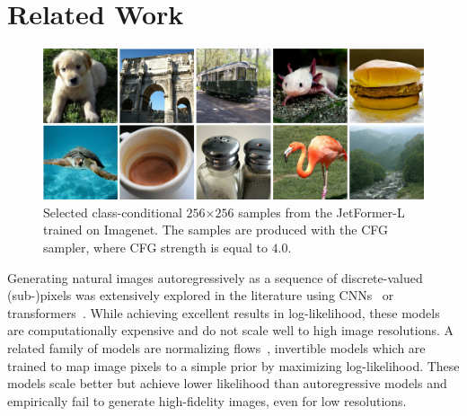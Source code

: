 \documentclass{article} %
\begin{document}
\section{Related Work}

\vspace{-1mm}

\begin{figure}
\vspace{-0.5cm}
    \centering
    \includegraphics[width=\textwidth]{figures/flagship-samples}
    \caption{Selected class-conditional $256$$\times$$256$ samples from the JetFormer-L trained on Imagenet. The samples are produced with the CFG sampler, where CFG strength is equal to $4.0$.}
    \label{fig:imagenet_examples}
\end{figure}

\vspace{-1mm}

Generating natural images autoregressively as a sequence of discrete-valued (sub-)pixels was extensively explored in the literature using CNNs~\citep{van2016pixel, van2016conditional, salimans2016pixelcnn} or transformers~\citep{parmar2018image,chen2020generative}. While achieving excellent results in log-likelihood, these models are computationally expensive and do not scale well to high image resolutions. A related family of models are normalizing flows~\citep{dinh2014nice, dinh2016density, kingma2018glow, ho2019flow++}, invertible models which are trained to map image pixels to a simple prior by maximizing log-likelihood. These models scale better but achieve lower likelihood than autoregressive models and empirically fail to generate high-fidelity images, even for low resolutions.
\end{document}

